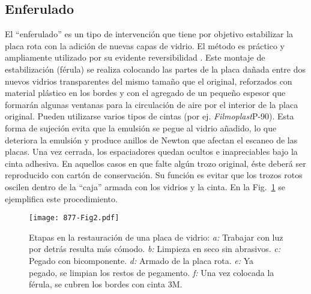 \documentclass[baaa]{baaa}
\begin{document}
\subsection{Enferulado}\label{enf}
El ``enferulado'' es un tipo de intervención que tiene por objetivo estabilizar la placa rota con la adición de nuevas capas de vidrio.
El método es práctico y ampliamente utilizado por su evidente reversibilidad \citep{hg_2014}.
Este montaje de estabilización (férula) se realiza colocando las partes de la placa dañada entre dos nuevos vidrios transparentes del mismo tamaño que el original, reforzados con material plástico en los bordes y con el agregado de un pequeño espesor que formarán algunas ventanas para la circulación de aire por el interior de la placa original.
Pueden utilizarse varios tipos de cintas (por ej. \textit{Filmoplast}\texttrademark P-90).
Esta forma de sujeción evita que la emulsión se pegue al vidrio añadido, lo que deteriora la emulsión y produce anillos de Newton que afectan el escaneo de las placas.
Una vez cerrada, los espaciadores quedan ocultos e inapreciables bajo la cinta adhesiva.
En aquellos casos en que falte algún trozo original, éste deberá ser reproducido con cartón de conservación.
Su función es evitar que los trozos rotos oscilen dentro de la ``caja'' armada con los vidrios y la cinta.
En la Fig.~\ref{Fig2} se ejemplifica este procedimiento.

\begin{figure}[!t]
\centering
\texttt{[image: 877-Fig2.pdf]}
\caption{Etapas en la restauración de una placa de vidrio:
\emph{a:} Trabajar con luz por detrás resulta más cómodo.
\emph{b:} Limpieza en seco sin abrasivos.
\emph{c:} Pegado con bicomponente.
\emph{d:} Armado de la placa rota.
\emph{e:} Ya pegado, se limpian los restos de pegamento.
\emph{f:} Una vez colocada la férula, se cubren los bordes con cinta 3M\texttrademark.
}
\label{Fig2}
\end{figure}
\end{document}
